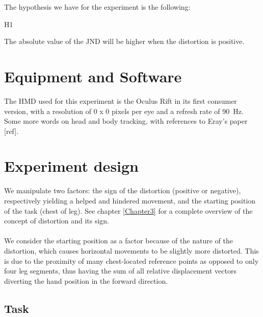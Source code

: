 The hypothesis we have for the experiment is the following:

\begin{labeling}{H1}
  \item [H1] The absolute value of the JND will be higher when the distortion is positive.
\end{labeling}

\section{Equipment and Software}

The HMD used for this experiment is the Oculus Rift in its first consumer version, with a resolution of 0 x 0 pixels per eye and a refresh rate of \SI{90}{\hertz}.
Some more words on head and body tracking, with references to Eray's paper [ref].

\section{Experiment design}

We manipulate two factors: the sign of the distortion (positive or negative), respectively yielding a helped and hindered movement, and the starting position of the task (chest of leg). See chapter \ref{Chapter3} for a complete overview of the concept of distortion and its sign.
\\\\
We consider the starting position as a factor because of the nature of the distortion, which causes horizontal movements to be slightly more distorted. This is due to the proximity of many chest-located reference points as opposed to only four leg segments, thus having the sum of all relative displacement vectors diverting the hand position in the forward direction.

\subsection{Task}

